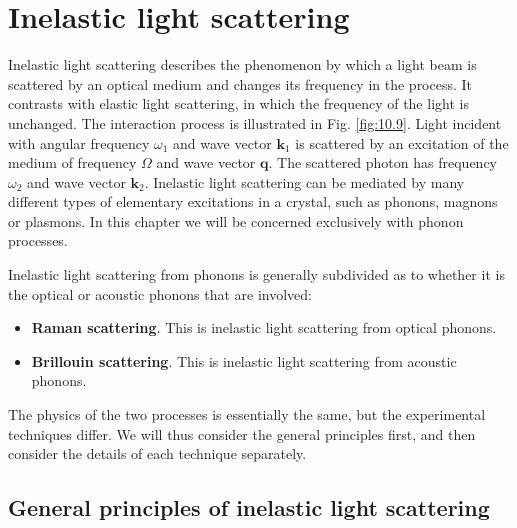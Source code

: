 \documentclass[12pt]{book}
\begin{document}
{\section{Inelastic light scattering}

Inelastic light scattering describes the phenomenon by which a light beam is scattered by an optical medium and changes its frequency in the process. It contrasts with elastic light scattering, in which the frequency of the light is unchanged. The interaction process is illustrated in Fig. \ref{fig:10.9}. Light incident with angular frequency $\omega_1$ and wave vector $\mathbf{k}_1$ is scattered by an excitation of the medium of frequency $\Omega$ and wave vector $\mathbf{q}$. The scattered photon has frequency $\omega_2$ and wave vector $\mathbf{k}_2$. Inelastic light scattering can be mediated by many different types of elementary excitations in a crystal, such as phonons, magnons or plasmons. In this chapter we will be concerned exclusively with phonon processes.

Inelastic light scattering from phonons is generally subdivided as to whether it is the optical or acoustic phonons that are involved:
\begin{itemize}
  \item \textbf{Raman scattering}. This is inelastic light scattering from optical phonons.
  \item \textbf{Brillouin scattering}. This is inelastic light scattering from acoustic phonons.
\end{itemize}
The physics of the two processes is essentially the same, but the experimental techniques differ. We will thus consider the general principles first, and then consider the details of each technique separately.

\subsection{General principles of inelastic light scattering}

}
\end{document}
